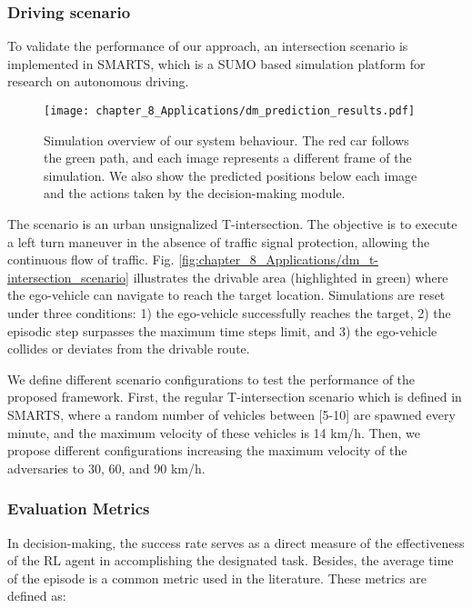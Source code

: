 \subsubsection{Driving scenario}
\label{subsubsec:8_decision_making_experimental_results_driving_scenario}

To validate the performance of our approach, an intersection scenario is implemented in SMARTS, which is a SUMO \cite{Sumo} based simulation platform for research on autonomous driving.

\begin{figure}[h]
	\centering        
	\texttt{[image: chapter\_8\_Applications/dm\_prediction\_results.pdf]}
	\caption{Simulation overview of our system behaviour. The red car follows the green path, and each image represents a different frame of the simulation. We also show the predicted positions below each image and the actions taken by the decision-making module.}
	\label{fig:chapter_8_Applications/dm_prediction_results}
\end{figure}

The scenario is an urban unsignalized T-intersection. The objective is to execute a left turn maneuver in the absence of traffic signal protection, allowing the continuous flow of traffic. Fig. \ref{fig:chapter_8_Applications/dm_t-intersection_scenario} illustrates the drivable area (highlighted in green) where the ego-vehicle can navigate to reach the target location. Simulations are reset under three conditions: 1) the ego-vehicle successfully reaches the target, 2) the episodic step surpasses the maximum time steps limit, and 3) the ego-vehicle collides or deviates from the drivable route.

We define different scenario configurations to test the performance of the proposed framework. First, the regular T-intersection scenario which is defined in SMARTS, where a random number of vehicles between [5-10] are spawned every minute, and the maximum velocity of these vehicles is 14 km/h. Then, we propose different configurations increasing the maximum velocity of the adversaries to 30, 60, and 90 km/h. 

\subsubsection{Evaluation Metrics}
\label{subsubsec:8_decision_making_experimental_results_evaluation_metrics}

In decision-making, the success rate serves as a direct measure of the effectiveness of the RL agent in accomplishing the designated task. Besides, the average time of the episode is a common metric used in the literature. These metrics are defined as:


